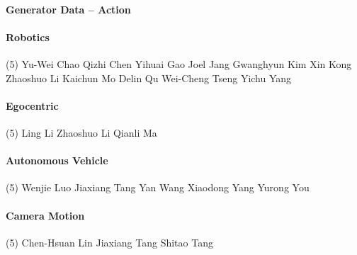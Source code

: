 \paragraph{Generator Data -- Action} \mbox{}
\vspace{-0.32\baselineskip}\paragraph{\footnotesize Robotics} \mbox{}
\vspace{-0.32\baselineskip}
\begingroup
\footnotesize
\begin{tasks}[label=\relax, label-width=0pt, item-indent=4pt](5)
\task Yu-Wei Chao
\task Qizhi Chen
\task Yihuai Gao
\task Joel Jang
\task Gwanghyun Kim
\task Xin Kong
\task Zhaoshuo Li
\task Kaichun Mo
\task Delin Qu
\task Wei-Cheng Tseng
\task Yichu Yang
\end{tasks}
\endgroup

\vspace{-0.32\baselineskip}\paragraph{\footnotesize Egocentric} \mbox{}
\vspace{-0.32\baselineskip}
\begingroup
\footnotesize
\begin{tasks}[label=\relax, label-width=0pt, item-indent=4pt](5)
\task Ling Li
\task Zhaoshuo Li
\task Qianli Ma
\end{tasks}
\endgroup

\vspace{-0.32\baselineskip}\paragraph{\footnotesize Autonomous Vehicle} \mbox{}
\vspace{-0.32\baselineskip}
\begingroup
\footnotesize
\begin{tasks}[label=\relax, label-width=0pt, item-indent=4pt](5)
\task Wenjie Luo
\task Jiaxiang Tang
\task Yan Wang
\task Xiaodong Yang
\task Yurong You
\end{tasks}
\endgroup

\vspace{-0.32\baselineskip}\paragraph{\footnotesize Camera Motion} \mbox{}
\vspace{-0.32\baselineskip}
\begingroup
\footnotesize
\begin{tasks}[label=\relax, label-width=0pt, item-indent=4pt](5)
\task Chen-Hsuan Lin
\task Jiaxiang Tang
\task Shitao Tang
\end{tasks}
\endgroup


